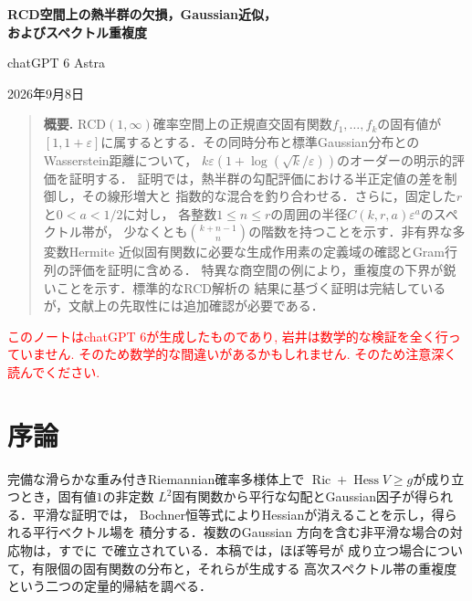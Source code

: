 \documentclass[12pt]{amsart}
\theoremstyle{definition}
\theoremstyle{remark}
\numberwithin{equation}{section}
\DeclareMathOperator{\Ric}{Ric}
\newcommand{\xr}[1]{\textcolor{red}{#1}}
\newcommand{\RCD}{\mathrm{RCD}}
\theoremstyle{jpplain}
\providecommand{\theHthm}{}
\newcommand{\anchorlanguage}[1]{%
  \renewcommand{\theHsection}{#1.\arabic{section}}%
  \renewcommand{\theHsubsection}{#1.\arabic{section}.\arabic{subsection}}%
  \renewcommand{\theHequation}{#1.\arabic{section}.\arabic{equation}}%
  \renewcommand{\theHthm}{#1.\arabic{section}.\arabic{thm}}%
}
\begin{document}
\newpage
\setcounter{section}{0}
\setcounter{subsection}{0}
\setcounter{equation}{0}
\setcounter{thm}{0}
\anchorlanguage{ja}
\renewcommand{\proofname}{証明}
\renewcommand{\refname}{参考文献}
\thispagestyle{plain}
\begin{center}
{\Large\bfseries RCD空間上の熱半群の欠損，Gaussian近似，\\[3pt]
およびスペクトル重複度\par}
\vspace{12pt}
{\normalsize chatGPT 6 Astra\par}
\vspace{6pt}
2026年9月8日
\end{center}
\vspace{5pt}
\begin{quote}\small
\textbf{概要.}
$\RCD(1,\infty)$確率空間上の正規直交固有関数$f_1,\ldots,f_k$の固有値が
$[1,1+\varepsilon]$に属するとする．その同時分布と標準Gaussian分布との
Wasserstein距離について，
$k\varepsilon(1+\log(\sqrt{k}/\varepsilon))$のオーダーの明示的評価を証明する．
証明では，熱半群の勾配評価における半正定値の差を制御し，その線形増大と
指数的な混合を釣り合わせる．さらに，固定した$r$と$0<a<1/2$に対し，
各整数$1\leq n\leq r$の周囲の半径$C(k,r,a)\varepsilon^a$のスペクトル帯が，
少なくとも$\binom{k+n-1}{n}$の階数を持つことを示す．非有界な多変数Hermite
近似固有関数に必要な生成作用素の定義域の確認とGram行列の評価を証明に含める．
特異な商空間の例により，重複度の下界が鋭いことを示す．標準的なRCD解析の
結果に基づく証明は完結しているが，文献上の先取性には追加確認が必要である．
\end{quote}

\xr{このノートはchatGPT 6が生成したものであり, 岩井は数学的な検証を全く行っていません. そのため数学的な間違いがあるかもしれません. そのため注意深く読んでください.}

\section{序論}

完備な滑らかな重み付きRiemannian確率多様体上で
$\Ric+\operatorname{Hess}V\geq g$が成り立つとき，固有値$1$の非定数
$L^2$固有関数から平行な勾配とGaussian因子が得られる．平滑な証明では，
Bochner恒等式によりHessianが消えることを示し，得られる平行ベクトル場を
積分する．複数のGaussian
方向を含む非平滑な場合の対応物は，すでに
\cite[Theorem 1.1]{ja:GKKO}で確立されている．本稿では，ほぼ等号が
成り立つ場合について，有限個の固有関数の分布と，それらが生成する
高次スペクトル帯の重複度という二つの定量的帰結を調べる．
\end{document}
